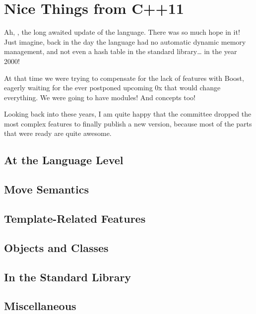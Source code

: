 \chapter{Nice Things from C++11}

Ah, , the long awaited update of the language. There was so much
hope in it! Just imagine, back in the day the language had no
automatic dynamic memory management, and not even a hash table in the
standard library… in the year 2000!

At that time we were trying to compensate for the lack of features
with Boost, eagerly waiting for the ever postponed upcoming \cpp 0x
that would change everything. We were going to have modules! And
concepts too!

Looking back into these years, I am quite happy that the committee
dropped the most complex features to finally publish a new version,
because most of the parts that were ready are quite awesome.

\section{At the Language Level}












\section{Move Semantics}


\section{Template-Related Features}




\section{Objects and Classes}






\section{In the Standard Library}















\section{Miscellaneous}


